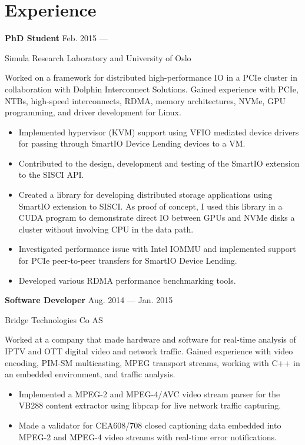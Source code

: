 \section{Experience}
\parbox[t][][t]{\linewidth}{
	\parbox{\linewidth}{\textbf{PhD Student}
		\hfill {{Feb. 2015 --- \phantom{Sep. 2018}}}}
		\smallbreak
	\parbox{\linewidth}{Simula Research Laboratory and University of Oslo}

	\bigskip
	Worked on a framework for distributed high-performance IO in a PCIe cluster in
	collaboration with Dolphin Interconnect Solutions. Gained
	experience with PCIe, NTBs, high-speed interconnects, RDMA, memory
	architectures, NVMe, GPU programming, and driver development for Linux.

	\bigskip
	\begin{itemize}
		\item{Implemented hypervisor (KVM) support using VFIO mediated device drivers
			for passing through SmartIO Device Lending devices to a VM.}\\[-.6em]
		\item{Contributed to the design, development and testing of the SmartIO
			extension to the SISCI API.}\\[-.6em]
		\item{Created a library for developing distributed storage
			applications using SmartIO extension to SISCI.
			As proof of concept, I used this library in a CUDA program to demonstrate direct
			IO between GPUs and NVMe disks a cluster without
			involving CPU in the data path.}\\[-.6em]
		\item{Investigated performance issue with Intel IOMMU and
			implemented support for PCIe peer-to-peer transfers for SmartIO Device Lending.}\\[-.6em]
		\item{Developed various RDMA performance benchmarking tools.}
	\end{itemize}
	\bigskip
	\bigskip
}

\parbox[t][][t]{\linewidth}{
	\parbox{\linewidth}{\textbf{Software Developer}
		\hfill {{Aug. 2014 --- Jan. 2015}}}
		\smallbreak
	\parbox{\linewidth}{Bridge Technologies Co AS}

	\bigskip
	Worked at a company that made hardware and software
	for real-time analysis of IPTV and OTT digital video and network
	traffic. Gained experience with video encoding, PIM-SM multicasting, MPEG transport
	streams, working with C++ in an embedded environment, and
	traffic analysis.

	\bigskip
	\begin{itemize}
		\item{Implemented a MPEG-2 and MPEG-4/AVC video stream parser for the
			VB288 content extractor using libpcap for live network
			traffic capturing.}\\[-.6em]
		\item{Made a validator for CEA608/708 closed captioning data
		embedded into MPEG-2 and MPEG-4 video streams with real-time
			error notifications.}
	\end{itemize}
	\bigskip
	\bigskip
}

